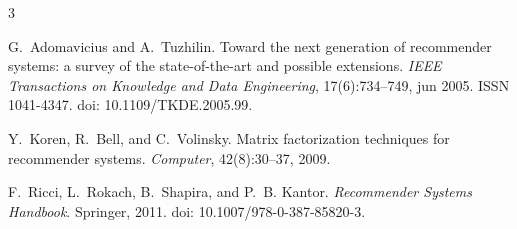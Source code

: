 \documentclass[sigconf,nonacm]{acmart}
\begin{document}
\vfill

\begin{thebibliography}{3}

G.~Adomavicius and A.~Tuzhilin.
\newblock Toward the next generation of recommender systems: a survey of the
  state-of-the-art and possible extensions.
\newblock \emph{IEEE Transactions on Knowledge and Data Engineering},
  17(6):734--749, jun 2005. ISSN 1041-4347. doi: 10.1109/TKDE.2005.99.

Y.~Koren, R.~Bell, and C.~Volinsky.
\newblock Matrix factorization techniques for recommender systems.
\newblock \emph{Computer}, 42(8):30--37, 2009.

F.~Ricci, L.~Rokach, B.~Shapira, and P.~B. Kantor.
\newblock \emph{Recommender Systems Handbook}.
\newblock Springer, 2011. doi: 10.1007/978-0-387-85820-3.

\end{thebibliography}
\end{document}
